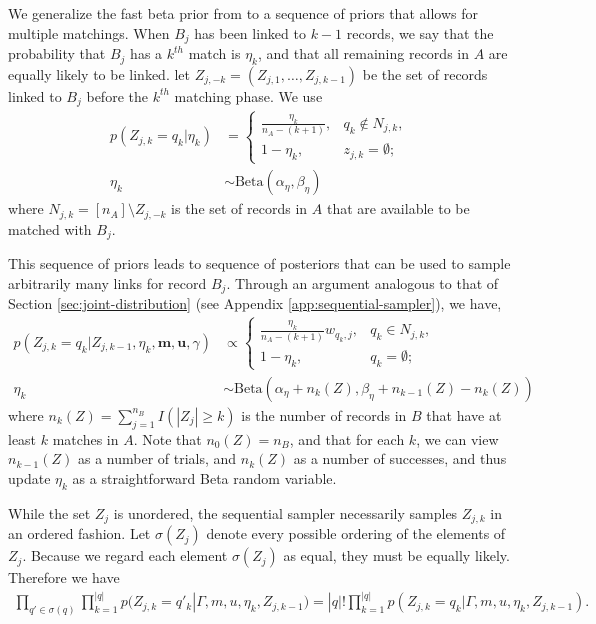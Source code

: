 \documentclass[12pt,letterpaper]{article}
\newcommand{\1}[1]{\mathbb{I}\!\left[#1\right]} %
\begin{document}
We generalize the fast beta prior from \cite{kundinger_2023} to a sequence of priors that allows for multiple matchings. When $B_j$ has been linked to $k-1$ records, we say that the probability that $B_j$ has a $k^{th}$ match is $\eta_k$, and that all remaining records in $A$ are equally likely to be linked. let $Z_{j, -k} = (Z_{j, 1}, \ldots, Z_{j, k-1})$ be the set of records linked to $B_j$ before the $k^{th}$ matching phase. We use
\begin{align} \label{eqn:sequential_prior}
	p(Z_{j, k} = q_k|\eta_k) &= \begin{cases}
		\frac{\eta_k}{n_A - (k + 1)}, &  q_k \notin N_{j, k}, \\
		1 - \eta_k, & z_{j, k} = \emptyset;
	\end{cases} \\
	\eta_k &\sim \text{Beta}(\alpha_{\eta}, \beta_{\eta})
\end{align}
where $N_{j, k} = [n_A] \setminus Z_{j, -k}$ is the set of records in $A$ that are available to be matched with $B_j$.

This sequence of priors leads to sequence of posteriors that can be used to sample arbitrarily many links for record $B_j$. Through an argument analogous to that of Section \ref{sec:joint-distribution} (see Appendix \ref{app:sequential-sampler}), we have,
\begin{align} \label{eqn:sequential_posterior}
	p(Z_{j, k} = q_k|Z_{j, k-1}, \eta_k, \bm{m}, \bm{u}, \gamma) &\propto \begin{cases}
		\frac{\eta_k}{n_A - (k + 1)} w_{q_k, j}, & q_k \in N_{j, k}, \\
		1 - \eta_k, & q_k= \emptyset;
	\end{cases} \\
	\eta_k &\sim \text{Beta}(\alpha_{\eta} + n_k(Z), \beta_{\eta} + n_{k-1}(Z) - n_k(Z))
\end{align}
where $n_k(Z) = \sum_{j=1}^{n_B} I( |Z_j| \geq k)$ is the number of records in $B$ that have at least $k$ matches in $A$. Note that $n_0(Z) = n_B$, and that for each $k$, we can view $n_{k-1}{(Z)}$ as a number of trials, and $n_{k}{(Z)}$ as a number of successes, and thus update $\eta_k$ as a straightforward Beta random variable. 

While the set $Z_j$ is unordered, the sequential sampler necessarily samples $Z_{j, k}$ in an ordered fashion. Let $\sigma(Z_j)$ denote every possible ordering of the elements of $Z_j$. Because we regard each element $\sigma(Z_j)$ as equal, they must be equally likely. Therefore we have
\begin{align}
	\prod_{q' \in \sigma(q)} \prod_{k=1}^{|q|} p(Z_{j, k} = q'_k| \Gamma, m, u, \eta_k, Z_{j, k-1}) = |q|! \prod_{k=1}^{|q|} p(Z_{j, k} = q_k| \Gamma, m, u, \eta_k, Z_{j, k-1}).
\end{align}
\end{document}
